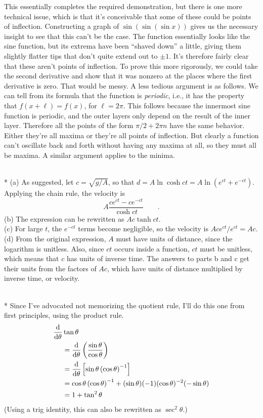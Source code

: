 This essentially completes the required demonstration, but there is one more technical issue, which
is that it's conceivable that some of these could
be points of inflection. Constructing a graph of $\sin(\sin(\sin x))$ gives us the necessary
insight to see that this can't be the case. The function essentially looks like the sine function, but
its extrema have been ``shaved down'' a little, giving them slightly flatter tips that don't quite extend
out to $\pm 1$. It's therefore fairly clear that these aren't points of inflection.
To prove this more rigorously, we could take the second derivative and show that it was
nonzero at the places where the first derivative is zero. That would be messy. A less tedious argument is
as follows. We can tell from its formula that the function is \emph{periodic}, i.e., it has the property that
$f(x+\ell)=f(x)$, for $\ell=2\pi$. This follows because the innermost sine function is periodic, and the outer layers only
depend on the result of the inner layer. Therefore all the points of the form $\pi/2+2\pi n$
have the same behavior. Either they're all maxima or they're all points of inflection. But clearly a
function can't oscillate back and forth without having any maxima at all, so they must all be maxima. A
similar argument applies to the minima.


\\*
(a) As suggested, let $c=\sqrt{g/A}$, so that  $d = A \ln\cosh ct=A\ln\left(e^{ct}+e^{-ct}\right)$.
Applying the chain rule, the velocity is
\begin{equation*}
  A\frac{ce^{ct}-ce^{-ct}}{\cosh ct} \qquad .
\end{equation*}
(b) The expression can be rewritten as $Ac\tanh ct$.\\
(c) For large $t$, the $e^{-ct}$ terms become negligible, so the velocity is $Ace^{ct}/e^{ct}=Ac$.
(d) From the original expression, $A$ must have units of distance, since the logarithm is unitless.
Also, since $ct$ occurs inside a function, $ct$ must be unitless, which means that $c$ has units
of inverse time. The answers to parts b and c get their units from the factors of $Ac$, which have
units of distance multiplied by inverse time, or velocity.

\\*
Since I've advocated not memorizing the quotient rule, I'll do this one from first principles,
using the product rule.
\begin{align*}
  \frac{\textup{d}}{\textup{d} \theta}& \tan\theta \\
        &=   \frac{\textup{d}}{\textup{d} \theta}\left(\frac{\sin\theta}{\cos\theta}\right) \\
        &=   \frac{\textup{d}}{\textup{d} \theta}\left[\sin\theta\left(\cos\theta\right)^{-1}\right] \\
        &=   \cos\theta\left(\cos\theta\right)^{-1}+(\sin\theta)(-1)(\cos\theta)^{-2}(-\sin\theta)\\
        &=   1+\tan^2\theta
\end{align*}
(Using a trig identity, this can also be rewritten as $\sec^2\theta$.)

